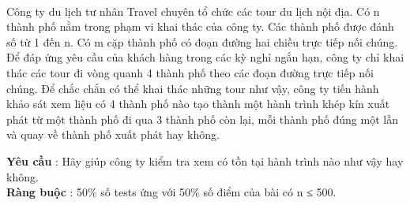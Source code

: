  

Công ty du lịch tư nhân Travel chuyên tổ chức các tour du lịch nội địa. Có n thành phố nằm trong phạm vi khai thác của công ty. Các thành phố được đánh số từ 1 đến n. Có m cặp thành phố có đoạn đường hai chiều trực tiếp nối chúng. Để đáp ứng yêu cầu của khách hàng trong các kỳ nghỉ ngắn hạn, công ty chỉ khai thác các tour đi vòng quanh 4 thành phố theo các đoạn đường trực tiếp nối chúng. Để chắc chắn có thể khai thác những tour như vậy, công ty tiến hành khảo sát xem liệu có 4 thành phố nào tạo thành một hành trình khép kín xuất phát từ một thành phố đi qua 3 thành phố còn lại, mỗi thành phố đúng một lần và quay về thành phố xuất phát hay không.

\textbf{Yêu cầu } : Hãy giúp công ty kiểm tra xem có tồn tại hành trình nào như vậy hay không.
\\\textbf{Ràng buộc } : 50\% số tests ứng với 50\% số điểm của bài có n ≤ 500.